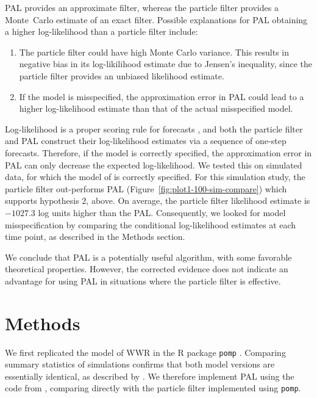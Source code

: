 \documentclass[10pt]{article}\usepackage[]{graphicx}\usepackage[]{xcolor}
\begin{document}
PAL provides an approximate filter, whereas the particle filter provides a Monte~Carlo estimate of an exact filter.
Possible explanations for PAL obtaining a higher log-likelihood than a particle filter include:
\begin{enumerate}
\item The particle filter could have high Monte Carlo variance. This results in negative bias in its log-likilihood estimate due to Jensen's inequality, since the particle filter provides an unbiased likelihood estimate.
\item If the model is misspecified, the approximation error in PAL could lead to a higher log-likelihood estimate than that of the actual misspecified model.
\end{enumerate}
Log-likelihood is a proper scoring rule for forecasts \cite{gneiting2}, and both the particle filter and PAL construct their log-likelihood estimates via a sequence of one-step forecasts.
Therefore, if the model is correctly specified, the approximation error in PAL can only decrease the expected log-likelihood.
We tested this on simulated data, for which the model of \cite{wwr} is correctly specified.
For this simulation study, the particle filter out-performs PAL (Figure~\ref{fig:plot1-100-sim-compare}) which supports hypothesis 2, above.
On average, the particle filter likelihood estimate is $-1027.3$ log units higher than the PAL.
Consequently, we looked for model misspecification by comparing the conditional log-likelihood estimates at each time point, as described in the Methods section.

We conclude that PAL is a potentially useful algorithm, with some favorable theoretical properties.
However, the corrected evidence does not indicate an advantage for using PAL in situations where the particle filter is effective.


\section*{Methods}

We first replicated the model of WWR in the R package \texttt{pomp} \citep{pomppackagepaper}.
Comparing summary statistics of simulations confirms that both model versions are essentially identical, as described by \citet{hao24}.
We therefore implement PAL using the code from \citet{wwr}, comparing directly with the particle filter implemented using \texttt{pomp}.
\end{document}
